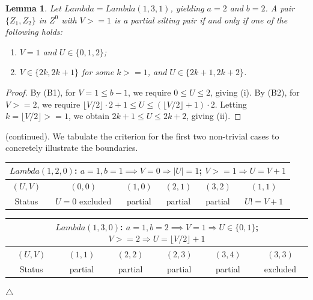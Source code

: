 \documentclass[11pt, a4paper]{article}
\newtheorem{lemma}[theorem]{Lemma}
\theoremstyle{definition}
\def\Lambda{Lambda}%
\def\ge{>=}%
\def\neq{!=}%
\def\mathcal#1{#1}%
\begin{document}
\begin{lemma}\label{lem:131-spec}
Let $\Lambda = \Lambda(1,3,1)$, yielding $a=2$ and $b=2$. A pair $\{Z_1, Z_2\}$ in $\mathcal Z^0$ with $V \ge 1$ is a partial silting pair if and only if one of the following holds:
\begin{enumerate}[label=\textup{(\roman*)}]
  \item $V = 1$ and $U \in \{0, 1, 2\}$;
  \item $V \in \{2k, 2k+1\}$ for some $k \ge 1$, and $U \in \{2k+1, 2k+2\}$.
\end{enumerate}
\end{lemma}
\begin{proof}
By (B1), for $V=1 \le b-1$, we require $0 \le U \le 2$, giving (i). By (B2), for $V \ge 2$, we require $\lfloor V/2 \rfloor \cdot 2 + 1 \le U \le (\lfloor V/2 \rfloor + 1) \cdot 2$. Letting $k = \lfloor V/2 \rfloor \ge 1$, we obtain $2k+1 \le U \le 2k+2$, giving (ii).
\end{proof}

 (continued). We tabulate the criterion for the first two non-trivial cases to concretely illustrate the boundaries.

\begin{table}[htbp]
\centering
\small
\begin{tabular}{c|c|c|c|c|c}
\multicolumn{6}{c}{$\Lambda(1,2,0)$: $a=1, b=1 \implies V=0\Rightarrow |U|=1$; $V\ge 1\Rightarrow U=V+1$} \\
\hline
$(U,V)$ & $(0,0)$ & $(1,0)$ & $(2,1)$ & $(3,2)$ & $(1,1)$ \\
Status & $U=0$ excluded & partial & partial & partial & $U\neq V+1$
\end{tabular}
\end{table}

\begin{table}[htbp]
\centering
\small
\begin{tabular}{c|c|c|c|c|c}
\multicolumn{6}{c}{$\Lambda(1,3,0)$: $a=1, b=2 \implies V=1\Rightarrow U\in\{0,1\}$; $V\ge 2\Rightarrow U=\lfloor V/2\rfloor+1$} \\
\hline
$(U,V)$ & $(1,1)$ & $(2,2)$ & $(2,3)$ & $(3,4)$ & $(3,3)$ \\
Status & partial & partial & partial & partial & excluded
\end{tabular}
\end{table} \hfill $\triangle$

\end{document}
